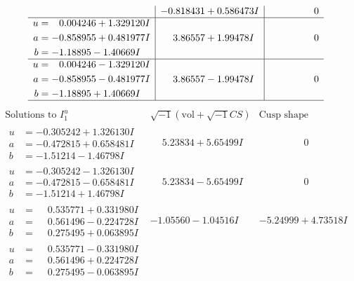 \documentclass[1p]{elsarticle_modified}
\theoremstyle{definition}
\newcommand{\I}{\sqrt{-1}}
\begin{document}
$$\begin{array}{c|c|c}
 & -0.818431 + 0.586473 I & \phantom{-0.000000 } 0 \\ \hline\begin{aligned}
u &= \phantom{-}0.004246 + 1.329120 I \\
a &= -0.858955 + 0.481977 I \\
b &= -1.18895 - 1.40669 I\end{aligned}
 & \phantom{-}3.86557 + 1.99478 I & \phantom{-0.000000 } 0 \\ \hline\begin{aligned}
u &= \phantom{-}0.004246 - 1.329120 I \\
a &= -0.858955 - 0.481977 I \\
b &= -1.18895 + 1.40669 I\end{aligned}
 & \phantom{-}3.86557 - 1.99478 I & \phantom{-0.000000 } 0\\
 \hline 
 \end{array}$$\newpage$$\begin{array}{c|c|c}  
\text{Solutions to }I^u_{1}& \I (\text{vol} + \sqrt{-1}CS) & \text{Cusp shape}\\
 \hline 
\begin{aligned}
u &= -0.305242 + 1.326130 I \\
a &= -0.472815 + 0.658481 I \\
b &= -1.51214 - 1.46798 I\end{aligned}
 & \phantom{-}5.23834 + 5.65499 I & \phantom{-0.000000 } 0 \\ \hline\begin{aligned}
u &= -0.305242 - 1.326130 I \\
a &= -0.472815 - 0.658481 I \\
b &= -1.51214 + 1.46798 I\end{aligned}
 & \phantom{-}5.23834 - 5.65499 I & \phantom{-0.000000 } 0 \\ \hline\begin{aligned}
u &= \phantom{-}0.535771 + 0.331980 I \\
a &= \phantom{-}0.561496 - 0.224728 I \\
b &= \phantom{-}0.275495 + 0.063895 I\end{aligned}
 & -1.05560 - 1.04516 I & -5.24999 + 4.73518 I \\ \hline\begin{aligned}
u &= \phantom{-}0.535771 - 0.331980 I \\
a &= \phantom{-}0.561496 + 0.224728 I \\
b &= \phantom{-}0.275495 - 0.063895 I\end{aligned}

\end{array}$$
\end{document}
